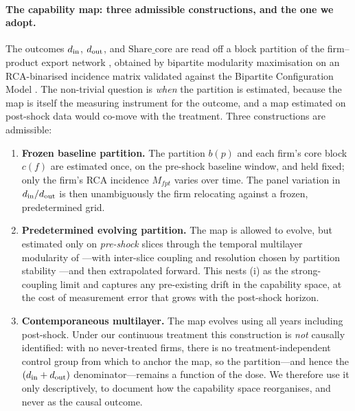 \paragraph{The capability map: three admissible constructions, and the one we adopt.}
The outcomes $d_{\rm in}$, $d_{\rm out}$, and $\text{Share\_core}$ are read off a
block partition of the firm--product export network \citep[the export, not production,
basis of][]{destefano2025}, obtained by bipartite modularity maximisation
\citep{barber2007} on an RCA-binarised incidence matrix validated against the Bipartite
Configuration Model \citep{squartini2011,saracco2015,cimini2022}. The non-trivial
question is \emph{when} the partition is estimated, because the map is itself the
measuring instrument for the outcome, and a map estimated on post-shock data would
co-move with the treatment. Three constructions are admissible:
\begin{enumerate}
  \renewcommand{\labelenumi}{(\roman{enumi})}
  \item \textbf{Frozen baseline partition.} The partition $b(p)$ and each firm's core
        block $c(f)$ are estimated once, on the pre-shock baseline window, and held
        fixed; only the firm's RCA incidence $M_{fpt}$ varies over time. The
        panel variation in $d_{\rm in}/d_{\rm out}$ is then unambiguously the firm
        relocating against a frozen, predetermined grid.
  \item \textbf{Predetermined evolving partition.} The map is allowed to evolve, but
        estimated only on \emph{pre-shock} slices through the temporal multilayer
        modularity of \citet{mucha2010}---with inter-slice coupling and resolution
        chosen by partition stability \citep{bazzi2016}---and then extrapolated forward.
        This nests (i) as the strong-coupling limit and captures any pre-existing drift
        in the capability space, at the cost of measurement error that grows with the
        post-shock horizon.
  \item \textbf{Contemporaneous multilayer.} The map evolves using all years including
        post-shock. Under our continuous treatment this construction is \emph{not}
        causally identified: with no never-treated firms, there is no
        treatment-independent control group from which to anchor the map, so the
        partition---and hence the $(d_{\rm in}+d_{\rm out})$ denominator---remains a
        function of the dose. We therefore use it only descriptively, to document how
        the capability space reorganises, and never as the causal outcome.
\end{enumerate}
